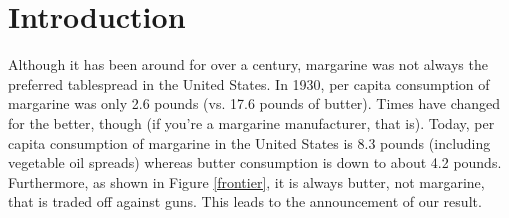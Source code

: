 \documentclass[mnsc,blindrev]{informs3}
\begin{document}
\maketitle

%


\section{Introduction}

Although it has been around for over a century, margarine was not
always the preferred tablespread in the United States. In 1930, per
capita consumption of margarine was only 2.6 pounds (vs. 17.6 pounds
of butter). Times have changed for the better, though (if you're a
margarine manufacturer, that is). Today, per capita consumption of
margarine in the United States is 8.3 pounds (including vegetable
oil spreads) whereas butter consumption is down to about 4.2 pounds.
Furthermore, as shown in Figure \ref{frontier}, it is always butter,
not margarine, that is traded off against guns. This leads to the announcement of our  result.
\end{document}
